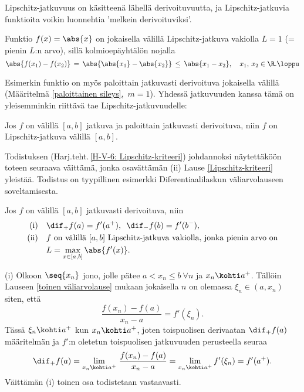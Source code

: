 Lipschitz-jatkuvuus on käsitteenä lähellä derivoituvuutta, ja Lipschitz-jatkuvia funktioita
voikin luonnehtia 'melkein derivoituviksi'.
\begin{Exa} Funktio $f(x)=\abs{x}$ on jokaisella välillä Lipschitz-jatkuva vakiolla $L=1$
(= pienin $L$:n arvo), sillä kolmioepäyhtälön nojalla
\[
\abs{f(x_1)-f(x_2)} \,=\, \abs{\abs{x_1}-\abs{x_2}} 
                    \,\le\, \abs{x_1-x_2}, \quad x_1,\,x_2\in\R. \loppu
\]
\end{Exa}
Esimerkin funktio on myös paloittain jatkuvasti derivoituva jokaisella välillä
(Määritelmä \ref{paloittainen sileys}, $\,m=1$). Yhdessä jatkuvuuden kanssa tämä on
yleisemminkin riittävä tae Lipschitz-jatkuvuudelle:
\begin{Lause} \label{Lipschitz-kriteeri} Jos $f$ on välillä $[a,b]$ jatkuva ja paloittain
jatkuvasti derivoituva, niin $f$ on Lipschitz-jatkuva välillä $[a,b]$.
\end{Lause}
Todistuksen (Harj.teht.\,\ref{H-V-6: Lipschitz-kriteeri}) johdannoksi näytettäköön toteen
seuraava väittämä, jonka osavättämän (ii) Lause \ref{Lipschitz-kriteeri} yleistää. Todistus
on tyypillinen esimerkki Diferentiaalilaskun väliarvolauseen soveltamisesta.
\begin{Lause} \label{Lipschitz-kriteeri 1}
Jos $f$ on välillä $[a,b]$ jatkuvasti derivoituva, niin
\begin{align*}
\text{(i)}  \quad 
            &\dif_+f(a) = f'(a^+),\,\ \dif_-f(b) = f'(b^-), \\
\text{(ii)} \quad 
            &\text{$f$ on välillä $[a,b]$ Lipschitz-jatkuva vakiolla, jonka pienin arvo on} \\
            &L=\max_{x\in [a,b]} \abs{f'(x)}.
\end{align*}
\end{Lause}
\tod (i) Olkoon $\seq{x_n}$ jono, jolle pätee $a < x_n \le b\ \forall n$ ja $x_n \kohti a^+$. 
Tällöin Lauseen \ref{toinen väliarvolause} mukaan jokaisella $n$ on olemassa 
$\xi_n \in (a,x_n)$ siten, että
\[
\frac{f(x_n)-f(a)}{x_n-a} = f'(\xi_n).
\]
Tässä $\xi_n \kohti a^+$ kun $x_n \kohti a^+$, joten toispuolisen derivaatan $\dif_+f(a)$ 
määritelmän ja $f'$:n oletetun toispuolisen jatkuvuuden perusteella seuraa
\[
\dif_+f(a) = \lim_{x_n\kohti a^+}\,\frac{f(x_n)-f(a)}{x_n-a} 
           = \lim_{x_n\kohti a^+} f'(\xi_n) = f'(a^+).
\]
Väittämän (i) toinen osa todistetaan vastaavasti.

